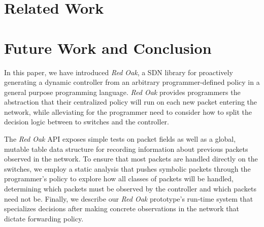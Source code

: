 \documentclass[preprint]{sigplanconf}
\begin{document}


\section*{Related Work}


\section*{Future Work and Conclusion}
In this paper, we have introduced \textit{Red Oak}, a SDN library for proactively generating a dynamic controller from an arbitrary programmer-defined policy in a general purpose programming language.
\textit{Red Oak} provides programmers the abstraction that their centralized policy will run on each 
new packet entering the network, while alleviating for the programmer need to consider
how to split the decision logic between to switches and the controller.

The \textit{Red Oak} API exposes simple tests on packet fields as well as a global, mutable table data
structure for recording information about previous packets observed in the network.
To ensure that most packets are handled directly on the switches, we employ a static analysis
that pushes symbolic packets through the programmer's policy to explore how all classes of 
packets will be handled, determining which packets must be observed by the controller and which 
packets need not be. Finally, we describe our \textit{Red Oak} prototype's run-time system that 
specializes decisions after making concrete observations in the network that dictate forwarding policy.




\end{document}
